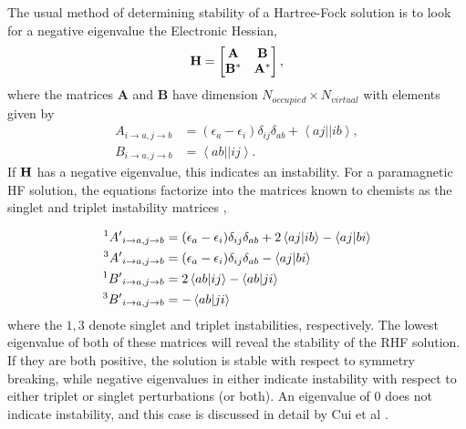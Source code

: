 \documentclass{revtex4}
\begin{document}
    The usual method of determining stability of a Hartree-Fock solution is to look for a negative
    eigenvalue the Electronic Hessian, 
    \begin{equation}
     \bf{H}=
     \begin{bmatrix}
     \bf{A} &\bf{B} \\
     \bf{B}^* & \bf{A}^* \\
     \end{bmatrix},
    \end{equation} 
    where the matrices $\mathbf{A}$ and $\mathbf{B}$ have dimension $N_{occupied} \times 
    N_{virtual}$ with elements given by
    \begin{align}
     A_{i \rightarrow a, j \rightarrow b} &= (\epsilon_a-\epsilon_i)\delta_{ij}\delta_{ab} 
     + \left< aj||ib \right>, \\
     B_{i \rightarrow a, j \rightarrow b} &= \left< ab||ij \right>. 
    \end{align}    
    If $\bf{H}$ has a negative eigenvalue, this indicates an 
    instability. For a paramagnetic HF solution, the equations 
    factorize into the matrices known to 
    chemists as the singlet and triplet instability matrices \cite{Dunning1967}\cite{Seeger1977},
    
     \begin{subequations}
     	\begin{align}
     	{}^{1}{A'}_{i\rightarrow a, j\rightarrow b} &= (\epsilon_a-\epsilon_i)\delta_{ij}\delta_{ab} 
     	+ 2\braket{aj|ib}-\braket{aj|bi}\\
     	{}^{3}{A'}_{i\rightarrow a, j\rightarrow b} &= (\epsilon_a-\epsilon_i)\delta_{ij}\delta_{ab} 
     	- \braket{aj|bi}\\
     	{}^{1}{B'}_{i\rightarrow a, j\rightarrow b} &= 2\braket{ab|ij}-\braket{ab|ji}\\
     	{}^{3}{B'}_{i\rightarrow a, j\rightarrow b} &= -\braket{ab|ji}
     	\end{align}
     \end{subequations}
     where the $1,3$ denote singlet and triplet instabilities, respectively. The lowest eigenvalue 
     of both of 
     these matrices will reveal the stability of the RHF solution. If they are both positive, the 
     solution is stable with respect to symmetry breaking, while negative eigenvalues in either 
     indicate instability with respect to either triplet or singlet perturbations (or both). An 
     eigenvalue of 0 does not indicate instability, and this case is discussed 
     in detail by Cui et al \cite{Cui2013}.
    
\end{document}
